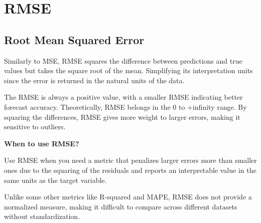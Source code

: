 \clearpage
\thispagestyle{regressionstyle}
\section{RMSE}
\subsection{Root Mean Squared Error}

Similarly to MSE, RMSE squares the difference between predictions and true values but takes the square root of the mean.
Simplifying its interpretation units since the error is returned in the natural units of the data.

\begin{center}
\end{center}

The RMSE is always a positive value, with a smaller RMSE indicating better forecast accuracy.
Theoretically, RMSE belongs in the 0 to +infinity range. By squaring the differences, RMSE gives more weight to larger errors, making it sensitive to outliers.

\textbf{When to use RMSE?}

Use RMSE when you need a metric that penalizes larger errors more than smaller ones due to the squaring of the residuals and reports an
interpretable value in the same units as the target variable.

{
    \item Unlike some other metrics like R-squared and MAPE, RMSE does not provide a normalized measure, making it difficult to compare across different datasets without standardization.
}

